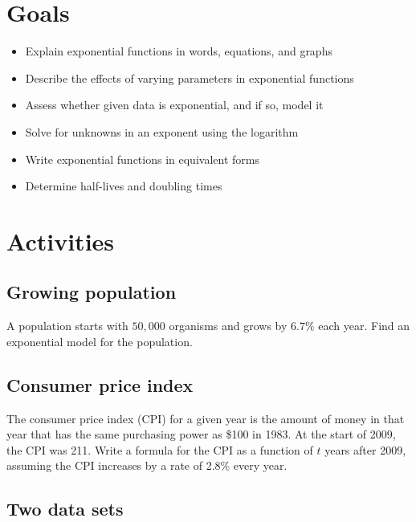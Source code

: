 \documentclass[
]{book}
\providecommand{\tightlist}{%
  \setlength{\itemsep}{0pt}\setlength{\parskip}{0pt}}
\begin{document}
\hypertarget{goals-3}{%
\section{Goals}\label{goals-3}}

\begin{itemize}
\tightlist
\item
  Explain exponential functions in words, equations, and graphs
\item
  Describe the effects of varying parameters in exponential functions
\item
  Assess whether given data is exponential, and if so, model it
\item
  Solve for unknowns in an exponent using the logarithm
\item
  Write exponential functions in equivalent forms
\item
  Determine half-lives and doubling times
\end{itemize}

\hypertarget{activities-3}{%
\section{Activities}\label{activities-3}}

\hypertarget{growing-population}{%
\subsection{Growing population}\label{growing-population}}

A population starts with \(50,000\) organisms and grows by \(6.7\%\) each year. Find an exponential model for the population.

\hypertarget{consumer-price-index}{%
\subsection{Consumer price index}\label{consumer-price-index}}

The consumer price index (CPI) for a given year is the amount of money in that year that has the same purchasing power as \$100 in 1983. At the start of 2009, the CPI was 211. Write a formula for the CPI as a function of \(t\) years after 2009, assuming the CPI increases by a rate of 2.8\% every year.

\hypertarget{two-data-sets}{%
\subsection{Two data sets}\label{two-data-sets}}
\end{document}

